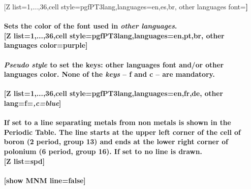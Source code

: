 \newpage\enlargethispage{\baselineskip}%
[Z list={1,...,36},cell style=pgfPT3lang,languages={en,es,br}, other languages font=\string\tiny\string\bfseries]%
\\ [10pt]\makebox[\linewidth][c]{\scalebox{.6}{\pgfPT[Z list={1,...,36},cell style=pgfPT3lang,languages={en,es,br},other languages font=\tiny\bfseries]}}%
\\ [0pt]\pgfPTendoption%
\label{option_other languages color}%
%
{Sets the color of the font used in \textit{other languages}.}%
\\ [5pt][Z list={1,...,36},cell style=pgfPT3lang,languages={en,pt,br}, other languages color=purple]%
\\ [10pt]\makebox[\linewidth][c]{\scalebox{.6}{\pgfPT[Z list={1,...,36},cell style=pgfPT3lang,languages={en,pt,br}, other languages color=purple]}}%
\\ [0pt]\pgfPTendoption%
\label{style_other lang}%
%
{\textit{Pseudo style} to set the keys: other languages \textbf{f}ont and/or other languages \textbf{c}olor. %
None of the \textit{keys} -- f and c -- are mandatory.
\\ [3pt]%
}%
\\ [5pt][Z list={1,...,36},cell style=pgfPT3lang,languages={en,fr,de}, other lang={f=\string\tiny\string\itshape,c=blue}]%
\\ [10pt]\makebox[\linewidth][c]{\scalebox{.6}{\pgfPT[Z list={1,...,36},cell style=pgfPT3lang,languages={en,fr,de}, other lang={f=\tiny\itshape,c=blue}]}}%
\\ [0pt]\pgfPTendstyle%
\label{option_show MNM line}%
%
{If set to  a line separating metals from non metals is shown in the Periodic Table. The line starts at the upper left corner of the cell of boron (2 period, group 13) and ends at the lower right corner of polonium (6 period, group 16). If set to  no line is drawn.
}%
\\ [5pt][Z list=spd]%
\\ [10pt]\makebox[\linewidth][c]{\scalebox{.6}{\pgfPT[Z list=spd]}}%
\\ [10pt][show MNM line=false]%
